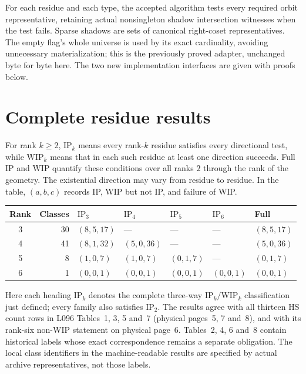 \documentclass[11pt]{article}
\begin{document}
For each residue and each type, the accepted algorithm tests every
required orbit representative, retaining actual nonsingleton shadow
intersection witnesses when the test fails. Sparse shadows are sets of
canonical right-coset representatives. The empty flag's whole universe
is used by its exact cardinality, avoiding unnecessary materialization;
this is the previously proved adapter, unchanged byte for byte here.
The two new implementation interfaces are given with proofs below.



\section{Complete residue results}
For rank $k\geq2$, $\mathrm{IP}_k$ means every rank-$k$ residue satisfies
every directional test, while $\mathrm{WIP}_k$ means that in each such
residue at least one direction succeeds. Full IP and WIP quantify these
conditions over all ranks $2$ through the rank of the geometry. The
existential direction may vary from residue to residue. In the table,
$(a,b,c)$ records IP, WIP but not IP, and failure of WIP.
\begin{center}
\begin{tabular}{crlllll}\toprule
Rank&Classes&$\mathrm{IP}_3$&$\mathrm{IP}_4$&$\mathrm{IP}_5$&$\mathrm{IP}_6$&Full\\\midrule
3&30&$(8,5,17)$&---&---&---&$(8,5,17)$\\
4&41&$(8,1,32)$&$(5,0,36)$&---&---&$(5,0,36)$\\
5&8&$(1,0,7)$&$(1,0,7)$&$(0,1,7)$&---&$(0,1,7)$\\
6&1&$(0,0,1)$&$(0,0,1)$&$(0,0,1)$&$(0,0,1)$&$(0,0,1)$\\\bottomrule
\end{tabular}
\end{center}
Here each heading $\mathrm{IP}_k$ denotes the complete three-way
$\mathrm{IP}_k/\mathrm{WIP}_k$ classification just defined; every family
also satisfies $\mathrm{IP}_2$. The results agree with all thirteen HS
count rows in L096 Tables~1, 3, 5 and~7 (physical pages~5, 7 and~8), and
with its rank-six non-WIP statement on physical page~6. Tables~2, 4, 6
and~8 contain historical labels whose exact correspondence remains a
separate obligation. The local class identifiers in the machine-readable
results are specified by actual archive representatives, not those labels.
\end{document}
